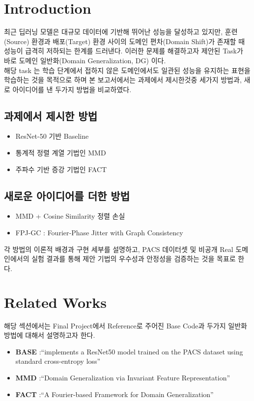 \section{Introduction}
\label{sec:intro}

최근 딥러닝 모델은 대규모 데이터에 기반해 뛰어난 성능을 달성하고 있지만, 
훈련(Source) 환경과 배포(Target) 환경 사이의 도메인 편차(Domain Shift)가 존재할 때 
성능이 급격히 저하되는 한계를 드러낸다. 이러한 문제를 해결하고자 제안된 Task가 바로 
도메인 일반화(Domain Generalization, DG) 이다.\\
해당 task 는 학습 단계에서 접하지 않은 도메인에서도 일관된 성능을 유지하는 표현을 
학습하는 것을 목적으로 하며 본 보고서에서는 과제에서 제시한것중 세가지 방법과, 
새로 아이디어를 낸 두가지 방법을 비교하였다.

\subsection{과제에서 제시한 방법}
\begin{itemize}[leftmargin=2em]
  \item ResNet-50 기반 Baseline
  \item 통계적 정렬 계열 기법인 MMD
  \item 주파수 기반 증강 기법인 FACT
\end{itemize}

\subsection{새로운 아이디어를 더한 방법}
\begin{itemize}[leftmargin=2em]
  \item MMD + Cosine Similarity 정렬 손실
  \item FPJ-GC : Fourier‑Phase Jitter with Graph Consistency
\end{itemize}
\vspace{1em}
각 방법의 이론적 배경과 구현 세부를 설명하고, PACS\cite{li2017pacs} 데이터셋 및 비공개 Real 도메인에서의 
실험 결과를 통해 제안 기법의 우수성과 안정성을 검증하는 것을 목표로 한다.

\section{Related Works}
해당 섹션에서는 Final Project에서 Reference로 주어진 Base Code과 두가지 일반화 방법에 대해서 설명하고자 한다.
\vspace{1em}
\begin{itemize}[leftmargin=2em]
  \item \textbf{BASE} \cite{he2016residual}:{“implements a ResNet50 model trained on the PACS dataset using standard cross-entropy loss”}
  \item \textbf{MMD} \cite{muandet2013invariant}:{“Domain Generalization via Invariant Feature Representation”}
  \item \textbf{FACT} \cite{xu2021fact}:{“A Fourier-based Framework for Domain Generalization”}
\end{itemize}
\vspace{1em}
